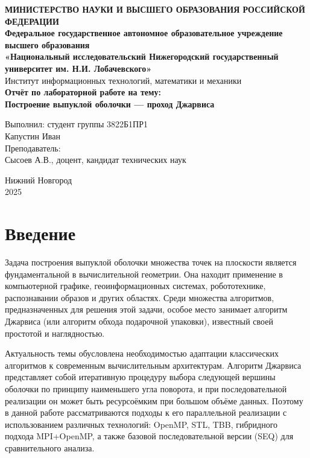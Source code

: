 \documentclass[a4paper,12pt]{article}
\begin{document}
\begin{titlepage}
\begin{center}
\textbf{МИНИСТЕРСТВО НАУКИ И ВЫСШЕГО ОБРАЗОВАНИЯ РОССИЙСКОЙ ФЕДЕРАЦИИ} \\[0.5cm]
\textbf{Федеральное государственное автономное образовательное учреждение высшего образования} \\[0.5cm]
\textbf{«Национальный исследовательский Нижегородский государственный университет им. Н.И. Лобачевского»} \\[0.5cm]
Институт информационных технологий, математики и механики \\
\vfill
{\Large
\textbf{Отчёт по лабораторной работе на тему:} \\[0.5cm]
\textbf{Построение выпуклой оболочки — проход Джарвиса} \\
}
\vfill
\begin{flushright}
Выполнил: студент группы 3822Б1ПР1 \\
Капустин Иван \\
\vspace{1cm}
Преподаватель: \\
Сысоев А.В., доцент, кандидат технических наук \\
\end{flushright}
\vfill
Нижний Новгород \\
2025
\end{center}
\end{titlepage}

\tableofcontents
\newpage

\section*{Введение}

Задача построения выпуклой оболочки множества точек на плоскости является фундаментальной в вычислительной геометрии. Она находит применение в компьютерной графике, геоинформационных системах, робототехнике, распознавании образов и других областях. Среди множества алгоритмов, предназначенных для решения этой задачи, особое место занимает алгоритм Джарвиса (или алгоритм обхода подарочной упаковки), известный своей простотой и наглядностью.

Актуальность темы обусловлена необходимостью адаптации классических алгоритмов к современным вычислительным архитектурам. Алгоритм Джарвиса представляет собой итеративную процедуру выбора следующей вершины оболочки по принципу наименьшего угла поворота, и при последовательной реализации он может быть ресурсоёмким при большом объёме данных. Поэтому в данной работе рассматриваются подходы к его параллельной реализации с использованием различных технологий: OpenMP, STL, TBB, гибридного подхода MPI+OpenMP, а также базовой последовательной версии (SEQ) для сравнительного анализа.
\end{document}

